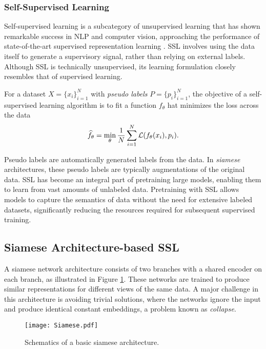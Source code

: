 \documentclass[../../thesis.tex]{subfiles}
\begin{document}
\subsubsection*{Self-Supervised Learning}

Self-supervised learning is a subcategory of unsupervised learning that has shown remarkable success in NLP and computer vision, approaching the performance of state-of-the-art supervised representation learning \cite{bardes2022vicreg, zbontar2021barlow}. SSL involves using the data itself to generate a supervisory signal, rather than relying on external labels. Although SSL is technically unsupervised, its learning formulation closely resembles that of supervised learning.\newline

For a dataset $X = \{x_i\}_{i=1}^N$ with \textit{pseudo labels} $P = \{p_i\}_{i=1}^N$, the objective of a self-supervised learning algorithm is to fit a function $f_\theta$ hat minimizes the loss across the data
\begin{equation}
    \widehat{f}_\theta = \min_\theta \frac{1}{N} \sum_{i=1}^N \mathcal{L}(f_\theta(x_i),p_i).
\end{equation}

Pseudo labels are automatically generated labels from the data. In \textit{siamese} architectures, these pseudo labels are typically augmentations of the original data. SSL has become an integral part of pretraining large models, enabling them to learn from vast amounts of unlabeled data. Pretraining with SSL allows models to capture the semantics of data without the need for extensive labeled datasets, significantly reducing the resources required for subsequent supervised training.

\subsection{Siamese Architecture-based SSL }
A siamese network architecture \cite{siamese} consists of two branches with a shared encoder on each branch, as illustrated in Figure \ref{fig:siamese}. These networks are trained to produce similar representations for different views of the same data. A major challenge in this architecture is avoiding trivial solutions, where the networks ignore the input and produce identical constant embeddings, a problem known as \textit{collapse}.\newline

\begin{figure}[h]
    \centering
    \texttt{[image: Siamese.pdf]}
    \caption{Schematics of a basic siamese architecture.}
    \label{fig:siamese}
\end{figure}
\end{document}
